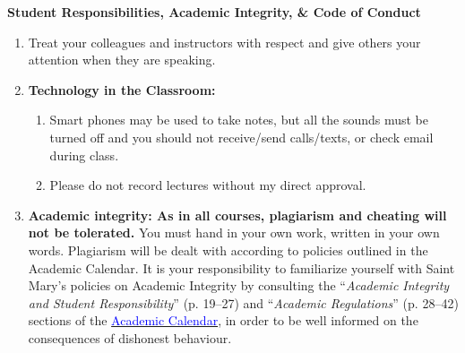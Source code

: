 \documentclass[hidelinks]{article}
\begin{document}
	\textbf{Student Responsibilities, Academic Integrity, \& Code of Conduct}
		\begin{enumerate}[topsep=0pt]
			\item Treat your colleagues and instructors with respect and give others your attention when they are speaking.
			\item \textbf{Technology in the Classroom:}
				\begin{enumerate}
					\item Smart phones may be used to take notes, but all the sounds must be turned off and you should not receive/send calls/texts, or check email during class.
					\item Please do not record lectures without my direct approval.
				\end{enumerate}
			\item \textbf{Academic integrity: As in all courses, plagiarism and cheating will not be tolerated.} You must hand in your own work, written in your own words. Plagiarism will be dealt with according to policies outlined in the Academic Calendar. It is your responsibility to familiarize yourself with Saint Mary's policies on Academic Integrity by consulting the ``\emph{Academic Integrity and Student Responsibility}'' (p. 19--27) and ``\emph{Academic Regulations}'' (p. 28--42) sections of the \href{https://smu.ca/webfiles/AcademicCalendar2019-2020-Undergraduate.pdf}{\textcolor{blue}{Academic Calendar}}, in order to be well informed on the consequences of dishonest behaviour.  
		\end{enumerate}

	\vspace{0.3cm}
 
\end{document}
